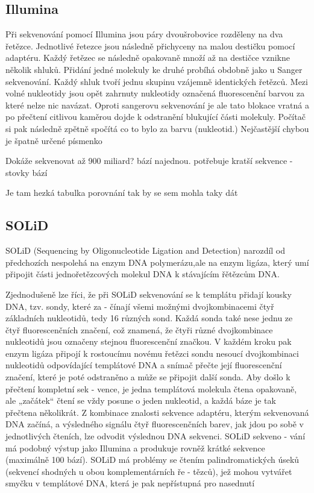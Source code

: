 \documentclass[czech,DP]{thesiskiv}
\begin{document}
\subsection{Illumina}
Při sekvenování pomocí Illumina jsou páry dvoušrobovice rozděleny na dva řetězce. Jednotlivé řetezce jsou následně přichyceny na malou destičku pomocí adaptéru. Každý řetězec se následně opakovaně množí až na destičce vznikne několik shluků. Přidání jedné molekuly ke druhé probíhá obdobně jako u Sanger sekvenování. Každý shluk tvoří jednu skupinu vzájemně identických řetězců. Mezi volné nukleotidy jsou opět zahrnuty nukleotidy označená fluorescenční barvou za které nelze nic navázat. Oproti sangerovu sekvenování je ale tato blokace vratná a po přečtení citlivou kaměrou dojde k odstranění blukující části molekuly. Počítač si pak následně zpětně spočítá co to bylo za barvu (nukleotid.) 
Nejčastější chybou je špatně určené písmenko
  


Dokáže sekvenovat až 900 miliard? bází najednou. 
potřebuje kratší sekvence - stovky bází



Je tam hezká tabulka porovnání tak by se sem mohla taky dát

\subsection{SOLiD}
SOLiD (Sequencing by Oligonucleotide Ligation and Detection)
narozdíl od předchozích nespolehá na enzym DNA polymerázu,ale na enzym ligáza, který umí připojit části jednořetězcových molekul DNA k stávajícím řětězcům DNA.

 Zjednodušeně lze říci,
že při SOLiD sekvenování se k templátu
přidají kousky DNA, tzv. sondy, které za -
čínají všemi možnými dvojkombinacemi
čtyř základních nukleotidů, tedy 16 různých sond. Každá sonda také nese jednu ze
čtyř fluorescenčních značení, což znamená, že čtyři různé dvojkombinace nukleotidů jsou označeny stejnou fluorescenční
značkou. V každém kroku pak enzym ligáza připojí k rostoucímu novému řetězci
sondu nesoucí dvojkombinaci nukleotidů odpovídající templátové DNA a snímač
přečte její fluorescenční značení, které je
poté odstraněno a může se připojit další
sonda. Aby došlo k přečtení kompletní sek -
vence, je jedna templátová molekula čtena
opakovaně, ale „začátek“ čtení se vždy
posune o jeden nukleotid, a každá báze je
tak přečtena několikrát. Z kombinace znalosti sekvence adaptéru, kterým sekvenovaná DNA začíná, a výsledného signálu
čtyř fluorescenčních barev, jak jdou po
sobě v jednotlivých čteních, lze odvodit
výslednou DNA sekvenci. SOLiD sekveno -
vání má podobný výstup jako Illumina
a produkuje rovněž krátké sekvence (maximálně 100 bází). SOLiD má problémy se
čtením palindromatických úseků (sekvencí shodných u obou komplementárních ře -
tězců), jež mohou vytvářet smyčku v templátové DNA, která je pak nepřístupná pro
nasednutí 
\end{document}

